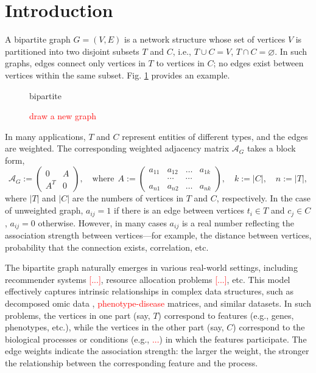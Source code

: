 \documentclass{llncs}
\newcommand{\red}[1]{\textcolor{red}{#1}}
\begin{document}

\section{Introduction}

A bipartite graph $G = (V, E)$ is a network structure whose set of vertices $V$ is partitioned into two disjoint subsets $T$ and $C$, i.e., $
T \cup C = V$,  $T \cap C = \varnothing$. In such graphs, edges connect only vertices in $T$ to vertices in $C$; no edges exist between vertices within the same subset. Fig. \ref{fig:nice_name} provides an example. 
\begin{figure}
 \centering
 {bipartite}
 \caption{\red{draw a new graph}}
 \label{fig:nice_name}
\end{figure}

In many applications, $T$ and $C$ represent entities of different types, and the edges are weighted. 
The corresponding weighted adjacency matrix $\mathcal{A}_G$ takes a block form,
\begin{equation}
\label{eq:adj_matrix}
\mathcal{A}_G := \begin{pmatrix}
0 & A\\
A^{T} & 0
\end{pmatrix},
\quad \text{where}~~
A := \begin{pmatrix}
a_{11} & a_{12} & \dots & a_{1k} \\
 &\cdots & \cdots & \\
a_{n1} & a_{n2} & \dots & a_{nk}
\end{pmatrix},
\quad k := |C|, \quad
n := |T|,
\end{equation}
where $|T|$ and $|C|$ are the numbers of vertices in $T$ and $C$, respectively. 
In the case of unweighted graph, $a_{ij} = 1$ if there is an edge between vertices $t_i\in T$ and $c_{j}\in C$, $a_{ij} = 0$ otherwise. However, in many cases $a_{ij}$ is a real number reflecting the association strength between vertices---for example, the distance between vertices, probability that the connection exists, correlation, etc. 

The bipartite graph naturally emerges in various real-world settings, including recommender systems \textcolor{red}{[...]}, 
resource allocation problems \textcolor{red}{[...]}, etc. This model effectively captures intrinsic relationships in complex data structures, such as decomposed omic data \cite{fertig_cogaps_2010, stein-obrien_enter_2018}, \textcolor{red}{phenotype-disease} matrices, and similar datasets. In such problems, the vertices in one part (say, $T$) correspond to features (e.g., genes, phenotypes, etc.), while the vertices in the other part (say, $C$) correspond to the biological processes or conditions (e.g., \textcolor{red}{...}) in which the features participate. The edge weights indicate the association strength: the larger the weight, the stronger the relationship between the corresponding feature and the process.
\end{document}
